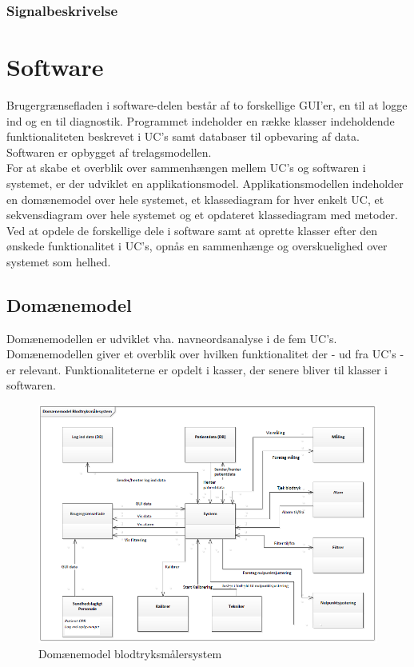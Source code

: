 \subsubsection{Signalbeskrivelse}

\section{Software}
Brugergrænsefladen i software-delen består af to forskellige GUI'er, en til at logge ind og en til diagnostik. Programmet indeholder en række klasser indeholdende funktionaliteten beskrevet i UC's samt databaser til opbevaring af data. Softwaren er opbygget af trelagsmodellen. \\
\newline
For at skabe et overblik over sammenhængen mellem UC's og softwaren i systemet, er der udviklet en applikationsmodel. Applikationsmodellen indeholder en domænemodel over hele systemet, et klassediagram for hver enkelt UC, et sekvensdiagram over hele systemet og et opdateret klassediagram med metoder. Ved at opdele de forskellige dele i software samt at oprette klasser efter den ønskede funktionalitet i UC's, opnås en sammenhænge og overskuelighed over systemet som helhed.
\subsection{Domænemodel}
Domænemodellen er udviklet vha. navneordsanalyse i de fem UC's. Domænemodellen giver et overblik over hvilken funktionalitet der - ud fra UC's - er relevant. Funktionaliteterne er opdelt i kasser, der senere bliver til klasser i softwaren. 

\begin{figure}[H]
\centering
\includegraphics[scale=0.70]{dom.PNG}
\caption{Domænemodel blodtryksmålersystem}
\end{figure}

